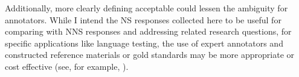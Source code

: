 Additionally, more clearly defining acceptable  could lessen the ambiguity for annotators. While I intend the NS responses collected here to be useful for comparing with NNS responses and addressing related research questions, for specific applications like language testing, the use of expert annotators and constructed reference materials or gold standards may be more appropriate or cost effective (see, for example, \citet{somasundaran:chodorow:14}).
